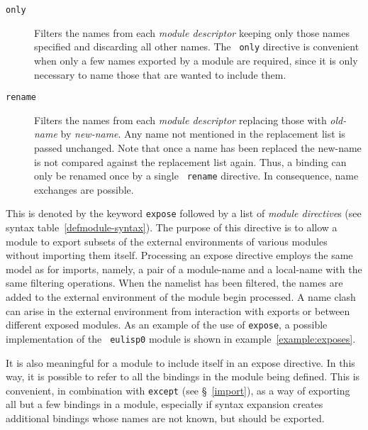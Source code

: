 \begin{optDefinition}
\begin{description}
    \item[{\tt only}] Filters the names from each {\em module descriptor}
    keeping only those names specified and discarding all other names.  The {\tt
        only} directive is convenient when only a few names exported by a module
    are required, since it is only necessary to name those that are wanted to
    include them.

    \item[{\tt rename}] Filters the names from each {\em module descriptor}
    replacing those with {\em old-name} by {\em new-name}.  Any name not
    mentioned in the replacement list is passed unchanged.  Note that once a
    name has been replaced the new-name is not compared against the replacement
    list again.  Thus, a binding can only be renamed once by a single {\tt
        rename} directive.  In consequence, name exchanges are possible.
\end{description}
\end{optDefinition}
%
\begin{optDefinition}
This is denoted by the keyword {\tt expose} followed by a list of {\em module
    directive\/}s (see syntax table~\ref{defmodule-syntax}).  The purpose of
this directive is to allow a module to export subsets of the external
environments of various modules without importing them itself.  Processing an
expose directive employs the same model as for imports, namely, a pair of a
module-name and a local-name with the same filtering operations.  When the
namelist has been filtered, the names are added to the external environment of
the module begin processed.  A name clash can arise in the external environment
from interaction with exports or between different exposed modules.  As an
example of the use of {\tt expose}, a possible implementation of the {\tt
    eulisp0}  module is shown in
example~\ref{example:exposes}.
%
\begin{example}
\label{example:exposes}
\end{example}
%
It is also meaningful for a module to include itself in an expose
directive.  In this way, it is possible to refer to all the bindings
in the module being defined.  This is convenient, in combination with
{\tt except} (see \S~\ref{import}), as a way of exporting all but
a few bindings in a module, especially if syntax expansion creates
additional bindings whose names are not known, but should be exported.
\end{optDefinition}
